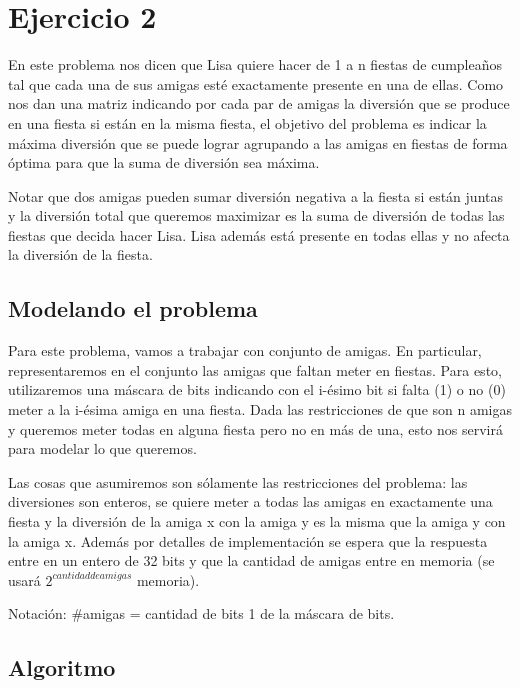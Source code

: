 \section{Ejercicio 2}


En este problema nos dicen que Lisa quiere hacer de 1 a n fiestas de cumpleaños tal que cada una de sus amigas esté exactamente presente en una de ellas. Como nos dan una matriz indicando por cada par de amigas la diversión que se produce en una fiesta si están en la misma fiesta, el objetivo del problema es indicar la máxima diversión que se puede lograr agrupando a las amigas en fiestas de forma óptima para que la suma de diversión sea máxima. \newline


Notar que dos amigas pueden sumar diversión negativa a la fiesta si están juntas y la diversión total que queremos maximizar es la suma de diversión de todas las fiestas que decida hacer Lisa. Lisa además está presente en todas ellas y no afecta la diversión de la fiesta.

\subsection{Modelando el problema}

Para este problema, vamos a trabajar con conjunto de amigas. En particular, representaremos en el conjunto las amigas que faltan meter en fiestas. Para esto, utilizaremos una máscara de bits indicando con el i-ésimo bit si falta (1) o no (0) meter a la i-ésima amiga en una fiesta. Dada las restricciones de que son n amigas y queremos meter todas en alguna fiesta pero no en más de una, esto nos servirá para modelar lo que queremos. \newline

Las cosas que asumiremos son sólamente las restricciones del problema: las diversiones son enteros, se quiere meter a todas las amigas en exactamente una fiesta y la diversión de la amiga x con la amiga y es la misma que la amiga y con la amiga x. Además por detalles de implementación se espera que la respuesta entre en un entero de 32 bits y que la cantidad de amigas entre en memoria (se usará $2^{cantidad de amigas}$ memoria).

Notación: \#amigas = cantidad de bits 1 de la máscara de bits. \newline

\subsection{Algoritmo}


